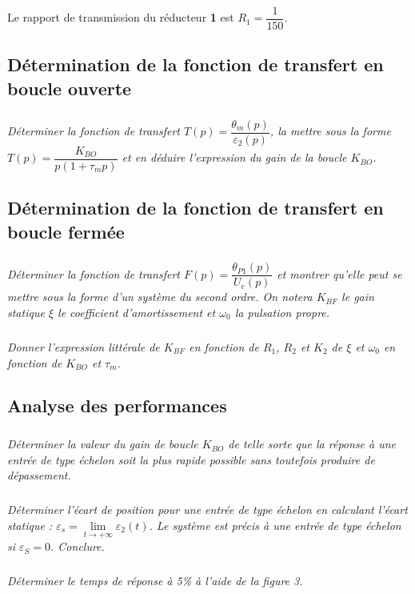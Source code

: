 \documentclass[10pt,fleqn]{article} %
\begin{document}
\begin{multicols}{2}
Le rapport de transmission du réducteur \textbf{1} est $R_1=\dfrac{1}{150}$.

\subsection*{Détermination de la fonction de transfert en boucle ouverte}
\subparagraph{}
\textit{Déterminer la fonction de transfert $T(p)=\dfrac{\theta_{m}(p)}{\varepsilon_2(p)}$, la mettre sous la forme 
$T(p)=\dfrac{K_{BO}}{p\left( 1+\tau_m p\right)}$ et en déduire l'expression du gain de la boucle $K_{BO}$.}

\subsection*{Détermination de la fonction de transfert en boucle fermée}
\subparagraph{}
\textit{Déterminer la fonction de transfert $F(p)=\dfrac{\theta_{P1}(p)}{U_e(p)}$ et montrer qu'elle peut se mettre sous la forme d'un système du second ordre. On notera $K_{BF}$ le gain statique $\xi$ le coefficient d'amortissement et $\omega_0$ la pulsation propre.}

\subparagraph{}
\textit{Donner l'expression littérale de $K_{BF}$ en fonction de $R_1$, $R_2$ et $K_2$ de $\xi$ et $\omega_0$ en fonction de $K_{BO}$ et $\tau_m$.}


\subsection*{Analyse des performances}
\subparagraph{\label{ques}}
\textit{Déterminer la valeur du gain de boucle $K_{BO}$ de telle sorte que la réponse à une entrée de type échelon soit la plus rapide possible sans toutefois produire de dépassement.}

\subparagraph{}
\textit{Déterminer l'écart de position pour une entrée de type échelon en calculant l'écart statique : 
$\varepsilon_s = \lim\limits_{t\to +\infty}\varepsilon_2(t)$. Le système est précis à une entrée de type échelon si $\varepsilon_S=0$. Conclure.}

\subparagraph{}
\textit{Déterminer le temps de réponse à 5\% à l'aide de la figure 3.}



\end{multicols}
\end{document}
